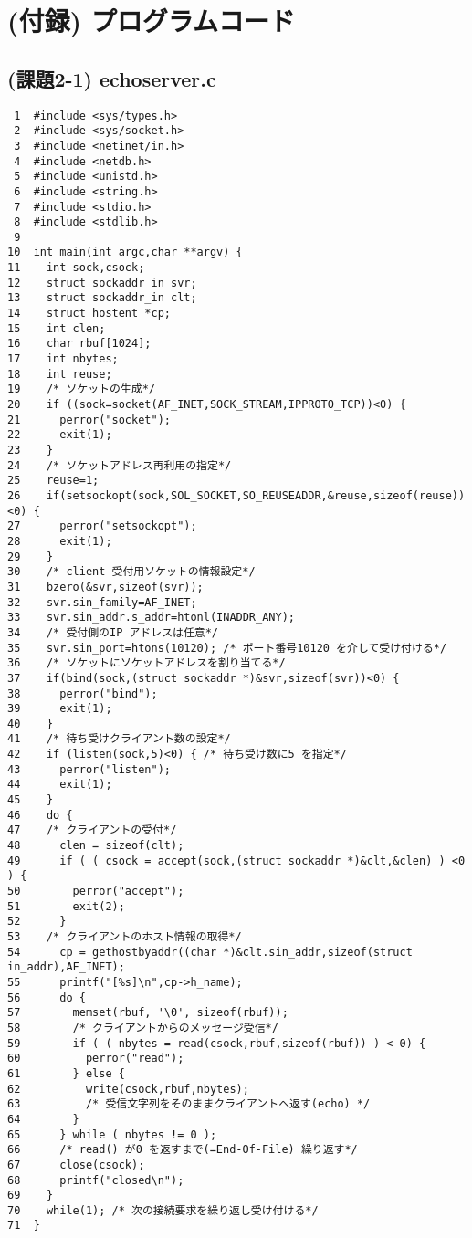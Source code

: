 \documentclass[a4j]{jarticle}
\begin{document}
\appendix %

\section{(付録) プログラムコード}

\subsection{(課題2-1) echoserver.c}
\label{sec:echoserver_code}
\small{
\begin{verbatim}
 1  #include <sys/types.h>
 2  #include <sys/socket.h>
 3  #include <netinet/in.h>
 4  #include <netdb.h>
 5  #include <unistd.h>
 6  #include <string.h>
 7  #include <stdio.h>
 8  #include <stdlib.h>
 9
10  int main(int argc,char **argv) {
11    int sock,csock;
12    struct sockaddr_in svr;
13    struct sockaddr_in clt;
14    struct hostent *cp;
15    int clen;
16    char rbuf[1024];
17    int nbytes;
18    int reuse;
19    /* ソケットの生成*/
20    if ((sock=socket(AF_INET,SOCK_STREAM,IPPROTO_TCP))<0) {
21      perror("socket");
22      exit(1);
23    }
24    /* ソケットアドレス再利用の指定*/
25    reuse=1;
26    if(setsockopt(sock,SOL_SOCKET,SO_REUSEADDR,&reuse,sizeof(reuse))<0) {
27      perror("setsockopt");
28      exit(1);
29    }
30    /* client 受付用ソケットの情報設定*/
31    bzero(&svr,sizeof(svr));
32    svr.sin_family=AF_INET;
33    svr.sin_addr.s_addr=htonl(INADDR_ANY);
34    /* 受付側のIP アドレスは任意*/
35    svr.sin_port=htons(10120); /* ポート番号10120 を介して受け付ける*/
36    /* ソケットにソケットアドレスを割り当てる*/
37    if(bind(sock,(struct sockaddr *)&svr,sizeof(svr))<0) {
38      perror("bind");
39      exit(1);
40    }
41    /* 待ち受けクライアント数の設定*/
42    if (listen(sock,5)<0) { /* 待ち受け数に5 を指定*/
43      perror("listen");
44      exit(1);
45    }
46    do {
47    /* クライアントの受付*/
48      clen = sizeof(clt);
49      if ( ( csock = accept(sock,(struct sockaddr *)&clt,&clen) ) <0 ) {
50        perror("accept");
51        exit(2);
52      }
53    /* クライアントのホスト情報の取得*/
54      cp = gethostbyaddr((char *)&clt.sin_addr,sizeof(struct in_addr),AF_INET);
55      printf("[%s]\n",cp->h_name);
56      do {
57        memset(rbuf, '\0', sizeof(rbuf));
58        /* クライアントからのメッセージ受信*/
59        if ( ( nbytes = read(csock,rbuf,sizeof(rbuf)) ) < 0) {
60          perror("read");
61        } else {
62          write(csock,rbuf,nbytes);
63          /* 受信文字列をそのままクライアントへ返す(echo) */
64        }
65      } while ( nbytes != 0 );
66      /* read() が0 を返すまで(=End-Of-File) 繰り返す*/
67      close(csock);
68      printf("closed\n");
69    }
70    while(1); /* 次の接続要求を繰り返し受け付ける*/
71  }
\end{verbatim}
}
\end{document}
